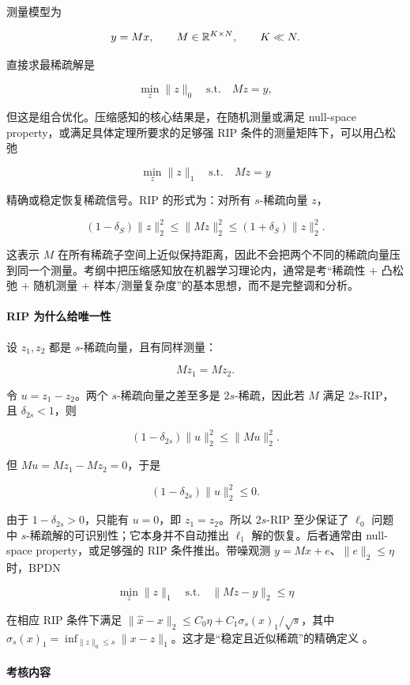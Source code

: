 测量模型为

\[
  y=Mx,
  \qquad
  M\in\mathbb{R}^{K\times N},
  \qquad
  K\ll N.
\]

直接求最稀疏解是

\[
  \min_z \|z\|_0
  \quad
  \text{s.t.}
  \quad
  Mz=y,
\]

但这是组合优化。压缩感知的核心结果是，在随机测量或满足 null-space property，或满足具体定理所要求的足够强 RIP 条件的测量矩阵下，可以用凸松弛

\[
  \min_z \|z\|_1
  \quad
  \text{s.t.}
  \quad
  Mz=y
\]

精确或稳定恢复稀疏信号。RIP 的形式为：对所有 \(s\)-稀疏向量 \(z\)，

\[
  (1-\delta_S)\|z\|_2^2
  \le
  \|Mz\|_2^2
  \le
  (1+\delta_S)\|z\|_2^2.
\]

这表示 \(M\) 在所有稀疏子空间上近似保持距离，因此不会把两个不同的稀疏向量压到同一个测量。考纲中把压缩感知放在机器学习理论内，通常是考“稀疏性 + 凸松弛 + 随机测量 + 样本/测量复杂度”的基本思想，而不是完整调和分析。

\paragraph{RIP 为什么给唯一性}

设 \(z_1,z_2\) 都是 \(s\)-稀疏向量，且有同样测量：

\[
  Mz_1=Mz_2.
\]

令 \(u=z_1-z_2\)。两个 \(s\)-稀疏向量之差至多是 \(2s\)-稀疏，因此若 \(M\) 满足 \(2s\)-RIP，且 \(\delta_{2s}<1\)，则

\[
  (1-\delta_{2s})\|u\|_2^2
  \le
  \|Mu\|_2^2.
\]

但 \(Mu=Mz_1-Mz_2=0\)，于是

\[
  (1-\delta_{2s})\|u\|_2^2\le 0.
\]

由于 \(1-\delta_{2s}>0\)，只能有 \(u=0\)，即 \(z_1=z_2\)。所以 \(2s\)-RIP 至少保证了 \(\ell_0\) 问题中 \(s\)-稀疏解的可识别性；它本身并不自动推出 \(\ell_1\) 解的恢复。后者通常由 null-space property，或足够强的 RIP 条件推出。带噪观测 \(y=Mx+e\)、\(\|e\|_2\le\eta\) 时，BPDN

\[
  \min_z\|z\|_1\quad\text{s.t.}\quad\|Mz-y\|_2\le\eta
\]

在相应 RIP 条件下满足 \(\|\hat x-x\|_2\le C_0\eta+C_1\sigma_s(x)_1/\sqrt{s}\)，其中 \(\sigma_s(x)_1=\inf_{\|z\|_0\le s}\|x-z\|_1\)。这才是“稳定且近似稀疏”的精确定义 \parencite{candes2006compressive}。

\paragraph{考核内容}


